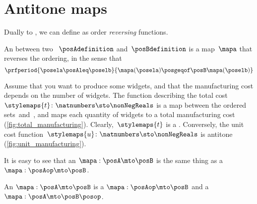 \section{Antitone maps}

Dually to , we can define  as order \emph{reversing} functions.

\begin{definition}
    \label{def:antitone}
    An  between two ~$\posAdefinition$ and~$\posBdefinition$ is a map~$\mapa$ that reverses the ordering, in the sense that
    \begin{equation}
        \prfperiod{
            \posela \posAleq \poselb
        }{
            \mapa(\posela) \posgeqof\posB \mapa(\poselb)
        }
    \end{equation}
\end{definition}

\begin{example}
    Assume that you want to produce some widgets, and that the manufacturing cost depends on the number of widgets.
    The function describing the total cost~$\stylemaps{t}\colon \natnumbers \sto \nonNegReals$ is a map between the ordered sets~\natnumbers and~\nonNegReals, and maps each quantity of widgets to a total manufacturing cost (\cref{fig:total_manufacturing}).
    Clearly,~$\stylemaps{t}$ is a .
    Conversely, the unit cost function~$\stylemaps{u}\colon \natnumbers \sto \nonNegReals$ is antitone (\cref{fig:unit_manufacturing}).
\end{example}

\begin{figure}[h!]
\end{figure}

It is easy to see that an  $\mapa: \posA \mto \posB$ is the same thing as a  $\mapa: \posAop \mto \posB$.

\begin{lemma}\label{lem:antitone-is-monotone}
    An  $\mapa: \posA \mto \posB$ is a  $\mapa: \posAop \mto \posB$
    and a  $\mapa: \posA \mto \posB\posop$.
\end{lemma}
